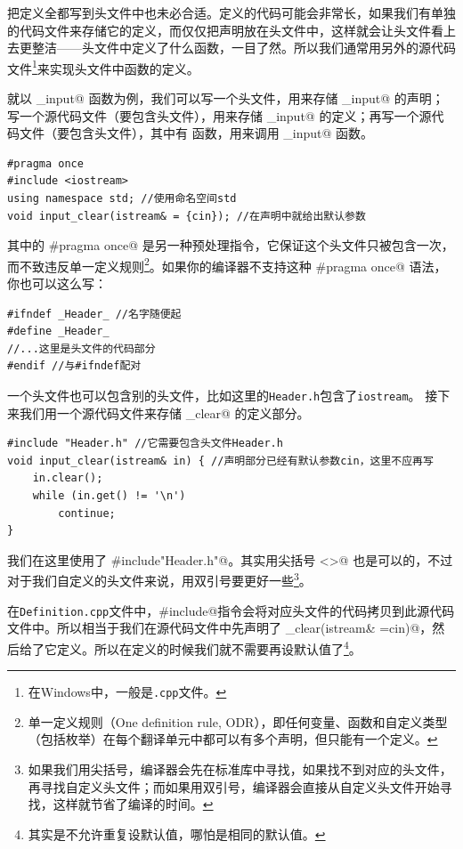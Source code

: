 把定义全都写到头文件中也未必合适。定义的代码可能会非常长，如果我们有单独的代码文件来存储它的定义，而仅仅把声明放在头文件中，这样就会让头文件看上去更整洁——头文件中定义了什么函数，一目了然。所以我们通常用另外的源代码文件\footnote{在Windows中，一般是\texttt{.cpp}文件。}来实现头文件中函数的定义。\par
就以 \lstinline@clear_input@ 函数为例，我们可以写一个头文件，用来存储 \lstinline@clear_input@ 的声明；写一个源代码文件（要包含头文件），用来存储 \lstinline@clear_input@ 的定义；再写一个源代码文件（要包含头文件），其中有 \lstinline@main@ 函数，用来调用 \lstinline@clear_input@ 函数。\par
\begin{lstlisting}[caption=\texttt{Header.h}]
#pragma once
#include <iostream>
using namespace std; //使用命名空间std
void input_clear(istream& = {cin}); //在声明中就给出默认参数
\end{lstlisting}
其中的 \lstinline@#pragma once@ 是另一种预处理指令，它保证这个头文件只被包含一次，而不致违反单一定义规则\footnote{单一定义规则（One definition rule, ODR），即任何变量、函数和自定义类型（包括枚举）在每个翻译单元中都可以有多个声明，但只能有一个定义。}。如果你的编译器不支持这种 \lstinline@#pragma once@ 语法，你也可以这么写：
\begin{lstlisting}
#ifndef _Header_ //名字随便起
#define _Header_ 
//...这里是头文件的代码部分
#endif //与#ifndef配对
\end{lstlisting}\par
一个头文件也可以包含别的头文件，比如这里的\texttt{Header.h}包含了\texttt{iostream}。
接下来我们用一个源代码文件来存储 \lstinline@input_clear@ 的定义部分。
\begin{lstlisting}[caption=\texttt{Definition.cpp}]
#include "Header.h" //它需要包含头文件Header.h
void input_clear(istream& in) { //声明部分已经有默认参数cin，这里不应再写
    in.clear();
    while (in.get() != '\n')
        continue;
}
\end{lstlisting}
我们在这里使用了 \lstinline@#include"Header.h"@。其实用尖括号 \lstinline@<>@ 也是可以的，不过对于我们自定义的头文件来说，用双引号要更好一些\footnote{如果我们用尖括号，编译器会先在标准库中寻找，如果找不到对应的头文件，再寻找自定义头文件；而如果用双引号，编译器会直接从自定义头文件开始寻找，这样就节省了编译的时间。}。\par
在\texttt{Definition.cpp}文件中，\lstinline@#include@指令会将对应头文件的代码拷贝到此源代码文件中。所以相当于我们在源代码文件中先声明了 \lstinline@input_clear(istream& ={cin})@，然后给了它定义。所以在定义的时候我们就不需要再设默认值了\footnote{其实是不允许重复设默认值，哪怕是相同的默认值。}。\par

